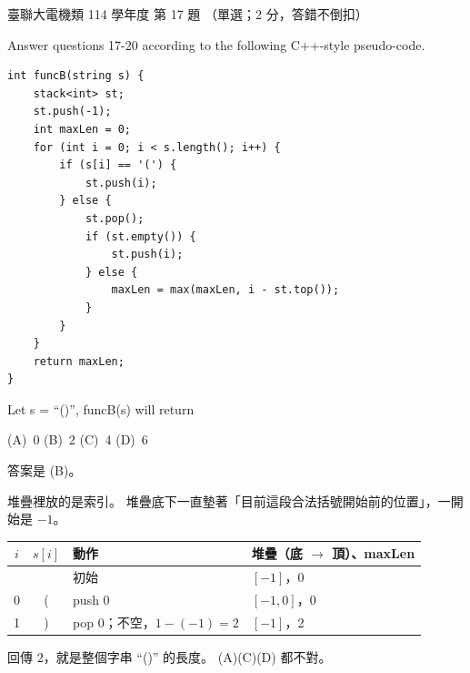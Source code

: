 \begin{pastexam}[label={px:ust-114-ee-ds-17}]{臺聯大電機類 114 學年度 第 17 題}
（單選；2 分，答錯不倒扣）

Answer questions 17-20 according to the following C++-style pseudo-code.
\begin{verbatim}
int funcB(string s) {
    stack<int> st;
    st.push(-1);
    int maxLen = 0;
    for (int i = 0; i < s.length(); i++) {
        if (s[i] == '(') {
            st.push(i);
        } else {
            st.pop();
            if (st.empty()) {
                st.push(i);
            } else {
                maxLen = max(maxLen, i - st.top());
            }
        }
    }
    return maxLen;
}
\end{verbatim}

Let s = ``()'', funcB(s) will return

(A)~0 \qquad (B)~2 \qquad (C)~4 \qquad (D)~6
\end{pastexam}

\begin{pastsoln}
答案是 (B)。

堆疊裡放的是索引。 堆疊底下一直墊著「目前這段合法括號開始前的位置」，一開始是 $-1$。
\begin{center}
\small
\begin{tabular}{ccll}
\toprule
$i$ & $s[i]$ & 動作 & 堆疊（底 $\to$ 頂）、maxLen \\
\midrule
 & & 初始 & $[-1]$，0 \\
0 & ( & push 0 & $[-1, 0]$，0 \\
1 & ) & pop 0；不空，$1 - (-1) = 2$ & $[-1]$，2 \\
\bottomrule
\end{tabular}
\end{center}
回傳 $2$，就是整個字串 ``()'' 的長度。 (A)(C)(D) 都不對。
\end{pastsoln}
